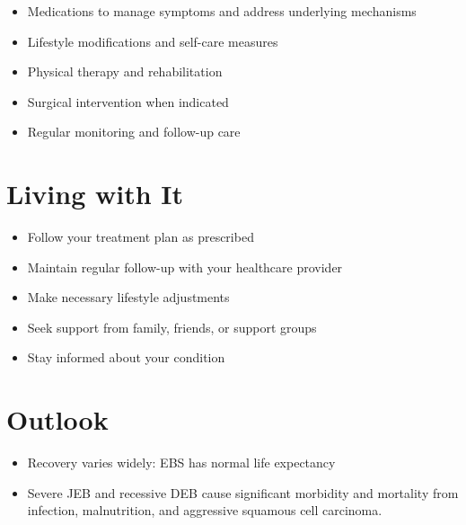\begin{itemize}[noitemsep]
  \item Medications to manage symptoms and address underlying mechanisms
  \item Lifestyle modifications and self-care measures
  \item Physical therapy and rehabilitation
  \item Surgical intervention when indicated
  \item Regular monitoring and follow-up care
\end{itemize}
\section{Living with It}
\begin{itemize}[noitemsep]
  \item Follow your treatment plan as prescribed
  \item Maintain regular follow-up with your healthcare provider
  \item Make necessary lifestyle adjustments
  \item Seek support from family, friends, or support groups
  \item Stay informed about your condition
\end{itemize}
\section{Outlook}
\begin{itemize}[noitemsep]
  \item Recovery varies widely: EBS has normal life expectancy
  \item Severe JEB and recessive DEB cause significant morbidity and mortality from infection, malnutrition, and aggressive squamous cell carcinoma.
\end{itemize}

